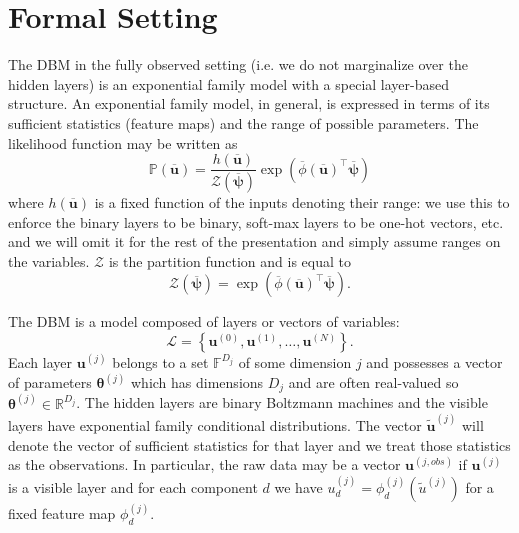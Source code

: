 \documentclass{article} %
\begin{document}
\section{Formal Setting}

The DBM in the fully observed setting (i.e. we do not marginalize over the hidden layers) is an exponential family model with a special
layer-based structure.  An exponential family model, in general, is expressed in terms of its sufficient statistics (feature maps)
and the range of possible parameters.  The likelihood function may be written as 
\begin{equation}
\mathbb{P}(\overline{\mathbf{u}}) = \frac{h(\overline{\mathbf{u}})}{\mathcal{Z}(\overline{\boldsymbol{\psi}})}\exp( \overline{\phi}(\overline{\mathbf{u}})^\top \overline{\boldsymbol{\psi}})
\end{equation}
where $h(\overline{\mathbf{u}})$ is a fixed function of the inputs denoting their range: we use this to enforce the binary layers to be
binary, soft-max layers to be one-hot vectors, etc. and we will omit it for the rest of the presentation and simply assume ranges
on the variables.
  $\mathcal{Z}$ is the partition function and is equal to 
\begin{equation}
\mathcal{Z}(\overline{\boldsymbol{\psi}}) = \exp( \overline{\phi}(\overline{\mathbf{u}})^\top \overline{\boldsymbol{\psi}}).
\end{equation}



The DBM is a model composed of layers or vectors of variables:
\begin{equation}
\mathcal{L}=\left\{\mathbf{u}^{(0)},\mathbf{u}^{(1)},\ldots,\mathbf{u}^{(N)}\right\}.
\end{equation}
Each layer $\mathbf{u}^{(j)}$ belongs to a set $\mathbb{F}^{D_j}$ of some dimension $j$ and possesses
a vector of parameters $\boldsymbol{\theta}^{(j)}$ which has dimensions $D_j$ and are often real-valued
so $\boldsymbol{\theta}^{(j)}\in\mathbb{R}^{D_j}$.  The hidden layers are binary Boltzmann machines
and the visible layers have exponential family conditional distributions.  The vector $\tilde{\mathbf{u}}^{(j)}$ will
denote the vector of sufficient statistics for that layer and we treat those
statistics as the observations.  In particular, the raw data may be a vector $\mathbf{u}^{(j,obs)}$ if $\mathbf{u}^{(j)}$
is a visible layer and for each component $d$ we have
$u^{(j)}_d=\phi_d^{(j)}(\tilde{u}^{(j)})$ for a fixed feature map $\phi_d^{(j)}$.
\end{document}
